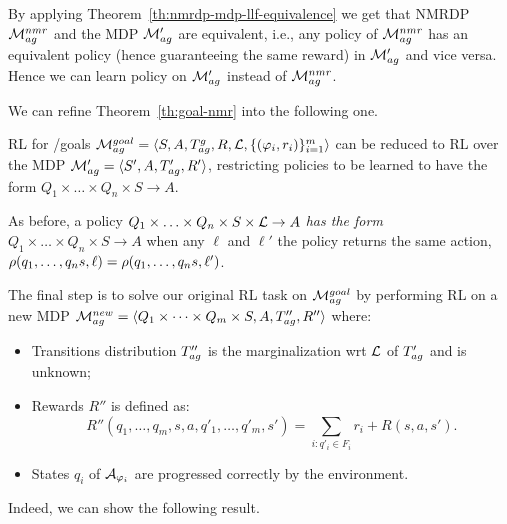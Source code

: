 By applying Theorem~\ref{th:nmrdp-mdp-llf-equivalence} we get that NMRDP $\mathcal{M}_{ag}^{nmr}$ and
the MDP $\mathcal{M}_{ag}'$ are equivalent, i.e., any policy of $\mathcal{M}_{ag}^{nmr}$
has an equivalent policy (hence guaranteeing the same reward) in
$\mathcal{M}_{ag}'$ and vice versa. Hence we can learn policy on $\mathcal{M}_{ag}'$ instead of $\mathcal{M}_{ag}^{nmr}$. 

We can refine Theorem~\ref{th:goal-nmr} into the following one.

\begin{theorem}\label{th:goal-mdp-ell}
	RL for \LTLf /\LDLf goals
	$\mathcal{M}_{ag}^{goal}= \langle S, A, T_{ag}^{g}, R, \mathcal{L},
	\{(\varphi_i,r_i)\}_{i=1}^{m} \rangle$ can be reduced to RL over the
	MDP $\mathcal{M}_{ag}'=\langle S',A,T'_{ag},R' \rangle$,
	restricting policies to be learned to have the form $Q_1\times\ldots\times Q_n\times S\rightarrow A$. %
\end{theorem}
As before, a policy $Q_1\times\ldots\times Q_n\times S \times \mathcal{L} \rightarrow A$ \emph{has the
	form} $Q_1\times\ldots\times Q_n\times S\rightarrow A$ when any
$\ell$ and $\ell'$ the policy returns the same action,
$\rho(q_1,\ldots, q_n s,\ell) = \rho(q_1,\ldots, q_n s,\ell') $.


\medskip
The final step is to
solve our original RL task on $\mathcal{M}_{ag}^{goal}$ by performing RL on a new MDP 
$\mathcal{M}_{ag}^{new}=\langle Q_1\times\cdots\times Q_m \times S,A,T''_{ag},R''\rangle$ where:
\begin{itemize}
	\item  Transitions distribution $T''_{ag}$ is the marginalization wrt $\mathcal{L}$ of $T'_{ag}$ and is unknown;
	\item  Rewards $R''$ is defined as:
	\[
	R''(q_1,\ldots,q_m, s, a, q'_1,\ldots,q'_m, s') = \sum_{i: q'_i\in F_i} r_i+R(s,a,s').
	\] 
	\item States $q_i$ of \DFAs $\mathcal{A}_{\varphi_i}$ are progressed correctly by the environment.
\end{itemize}

Indeed, we can show the following result.


